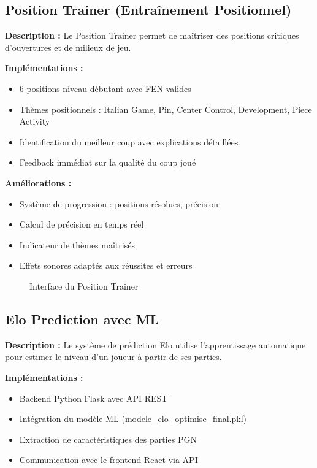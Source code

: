 \documentclass[a4paper,12pt]{article}
\begin{document}
\subsection{Position Trainer (Entraînement Positionnel)}

\textbf{Description :}
Le Position Trainer permet de maîtriser des positions critiques d'ouvertures et de milieux de jeu.

\textbf{Implémentations :}
\begin{itemize}
    \item 6 positions niveau débutant avec FEN valides
    \item Thèmes positionnels : Italian Game, Pin, Center Control, Development, Piece Activity
    \item Identification du meilleur coup avec explications détaillées
    \item Feedback immédiat sur la qualité du coup joué
\end{itemize}

\textbf{Améliorations :}
\begin{itemize}
    \item Système de progression : positions résolues, précision
    \item Calcul de précision en temps réel
    \item Indicateur de thèmes maîtrisés
    \item Effets sonores adaptés aux réussites et erreurs
\end{itemize}

\begin{figure}[h]
    \centering
    \caption{Interface du Position Trainer}
    \label{fig:position}
\end{figure}

\subsection{Elo Prediction avec ML}

\textbf{Description :}
Le système de prédiction Elo utilise l'apprentissage automatique pour estimer le niveau d'un joueur à partir de ses parties.

\textbf{Implémentations :}
\begin{itemize}
    \item Backend Python Flask avec API REST
    \item Intégration du modèle ML (modele\_elo\_optimise\_final.pkl)
    \item Extraction de caractéristiques des parties PGN
    \item Communication avec le frontend React via API
\end{itemize}
\end{document}
